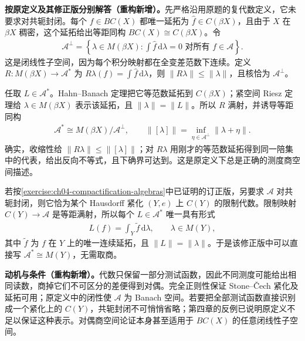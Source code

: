 \documentclass[../../main.tex]{subfiles}
\begin{document}
\begin{solution}
\textbf{按原定义及其修正版分别解答（重构新增）。}先严格沿用原题的复代数定义，它未要求对共轭封闭。每个 $f\in BC(X)$ 都唯一延拓为 $\widehat f\in C(\beta X)$，且由于 $X$ 在 $\beta X$ 稠密，这个延拓给出等距同构 $BC(X)\cong C(\beta X)$。令
\begin{align*}
\mathcal A^\perp=\left\{\lambda\in M(\beta X):
\int\widehat f\,\mathrm d\lambda=0\text{ 对所有 }f\in\mathcal A\right\}.
\end{align*}
这是闭线性子空间，因为每个积分映射都在全变差范数下连续。定义 $R:M(\beta X)\to\mathcal A^*$ 为 $R\lambda(f)=\int\widehat f\,\mathrm d\lambda$，则 $\|R\lambda\|\leqslant\|\lambda\|$，且核恰为 $\mathcal A^\perp$。

任取 $L\in\mathcal A^*$。Hahn--Banach 定理把它等范数延拓到 $C(\beta X)$；紧空间 Riesz 定理给 $\lambda\in M(\beta X)$ 表示该延拓，且 $\|\lambda\|=\|L\|$。所以 $R$ 满射，并诱导等距同构
\begin{align*}
\mathcal A^*\cong M(\beta X)/\mathcal A^\perp,\qquad
\|[\lambda]\|=\inf_{\eta\in\mathcal A^\perp}\|\lambda+\eta\|.
\end{align*}
确实，收缩性给 $\|R\lambda\|\leqslant\|[\lambda]\|$；对 $R\lambda$ 用刚才的等范数延拓得到同一陪集中的代表，给出反向不等式，且下确界可达到。这是原定义下总是正确的测度商空间描述。

若按\cref{exercise:ch04-compactification-algebras}中已证明的订正版，另要求 $\mathcal A$ 对共轭封闭，则它恰为某个 Hausdorff 紧化 $(Y,e)$ 上 $C(Y)$ 的限制代数。限制映射 $C(Y)\to\mathcal A$ 是等距满射，所以每个 $L\in\mathcal A^*$ 唯一具有形式
\begin{align*}
L(f)=\int_Y\widetilde f\,\mathrm d\lambda,\qquad\lambda\in M(Y),
\end{align*}
其中 $\widetilde f$ 为 $f$ 在 $Y$ 上的唯一连续延拓，且 $\|L\|=\|\lambda\|$。于是该修正版中可以直接写 $\mathcal A^*\cong M(Y)$，无需取商。
\end{solution}
\begin{remark}
\textbf{动机与条件（重构新增）。}代数只保留一部分测试函数，因此不同测度可能给出相同读数，商掉它们不可区分的差便得到对偶。完全正则性保证 Stone--Čech 紧化及延拓可用；原定义中的闭性使 $\mathcal A$ 为 Banach 空间。若要把全部测试函数直接识别成一个紧化上的 $C(Y)$，共轭封闭不可悄悄省略；第四章的反例已说明原定义不足以保证这种表示。对偶商空间论证本身甚至适用于 $BC(X)$ 的任意闭线性子空间。
\end{remark}

\end{document}
